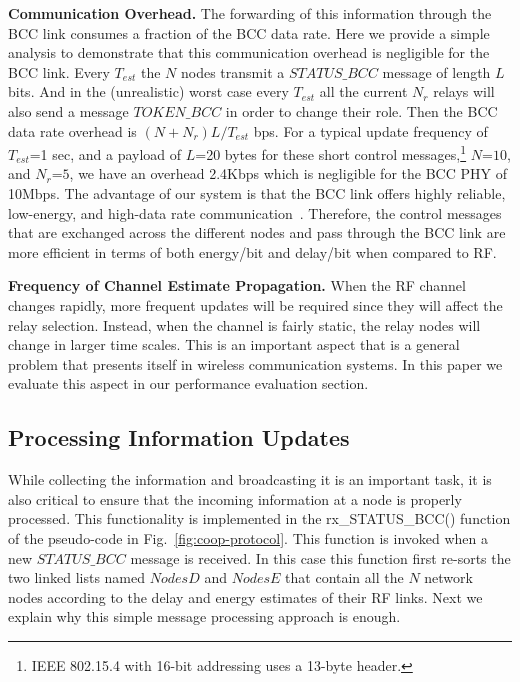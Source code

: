\documentclass[10pt]{IEEEtran}
\newcounter{section:outage-analysis}
\begin{document}
\textbf{Communication Overhead.} The forwarding of this information through the BCC link consumes a fraction of the BCC data rate. Here we provide a simple analysis to demonstrate that this communication overhead is negligible for the BCC link. Every $T_{est}$ the $N$ nodes transmit a $STATUS\_BCC$ message of length $L$ bits. And in the (unrealistic) worst case every $T_{est}$ all the current $N_r$ relays will also send a message $TOKEN\_BCC$ in order to change their role. Then the BCC data rate overhead is $(N +N_r)L/T_{est}$ bps. For a typical update frequency of $T_{est}$=1 sec, and a payload of $L$=20 bytes for these short control messages,\footnote{IEEE 802.15.4 with 16-bit addressing uses a 13-byte header.} $N$=$10$, and $N_r$=$5$, we have an overhead 2.4Kbps which is negligible for the BCC PHY of 10Mbps. The advantage of our system is that the BCC link offers highly reliable, low-energy, and high-data rate communication~\cite{baldus09,schenk08}. Therefore, the control messages that are exchanged across the different nodes and pass through the BCC link are more efficient in terms of both energy/bit and delay/bit when compared to RF.

\textbf{Frequency of Channel Estimate Propagation.} When the RF channel changes rapidly, more frequent updates will be required since they will affect the relay selection. Instead, when the channel is fairly static, the relay nodes will change in larger time scales. This is an important aspect that is a general problem that presents itself in wireless communication systems. In this paper we evaluate this aspect in our performance evaluation section.


\subsection{Processing Information Updates}
\label{subsection:2}
While collecting the information and broadcasting it is an important task, it is also critical to ensure that the incoming information at a node is properly processed. This functionality is implemented in the rx\_STATUS\_BCC() function of the pseudo-code in Fig.~\ref{fig:coop-protocol}. This function is invoked when a new $STATUS\_BCC$ message is received. In this case this function first re-sorts the two linked lists named $NodesD$ and $NodesE$ that contain all the $N$ network nodes according to the delay and energy estimates of their RF links. Next we explain why this simple message processing approach is enough.
\end{document}
